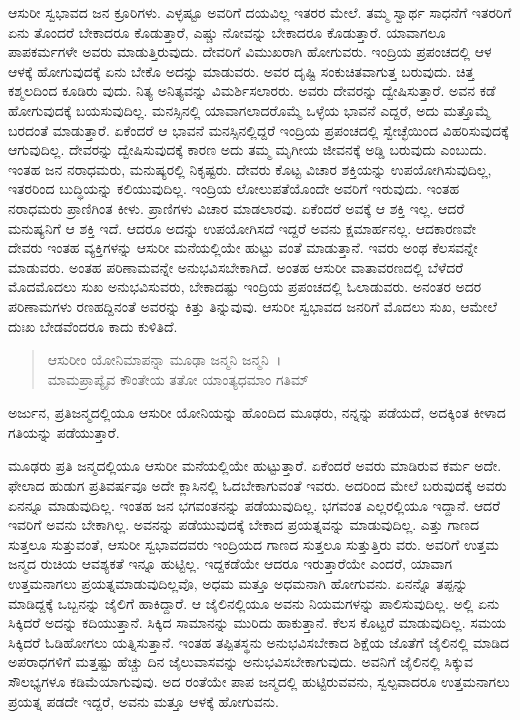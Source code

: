 ಆಸುರೀ ಸ್ವಭಾವದ ಜನ ಕ್ರೂರಿಗಳು. ಎಳ್ಳಷ್ಟೂ ಅವರಿಗೆ ದಯವಿಲ್ಲ ಇತರರ ಮೇಲೆ. ತಮ್ಮ ಸ್ವಾರ್ಥ ಸಾಧನೆಗೆ ಇತರರಿಗೆ ಏನು ತೊಂದರೆ ಬೇಕಾದರೂ ಕೊಡುತ್ತಾರೆ, ಎಷ್ಚು ನೋವನ್ನು ಬೇಕಾದರೂ ಕೊಡುತ್ತಾರೆ. ಯಾವಾಗಲೂ ಪಾಪಕರ್ಮಗಳೇ ಅವರು ಮಾಡುತ್ತಿರುವುದು. ದೇವರಿಗೆ ವಿಮುಖರಾಗಿ ಹೋಗುವರು. ಇಂದ್ರಿಯ ಪ್ರಪಂಚದಲ್ಲಿ ಆಳ ಆಳಕ್ಕೆ ಹೋಗುವುದಕ್ಕೆ ಏನು ಬೇಕೊ ಅದನ್ನು ಮಾಡುವರು. ಅವರ ದೃಷ್ಟಿ ಸಂಕುಚಿತವಾಗುತ್ತ ಬರುವುದು. ಚಿತ್ತ ಕಶ್ಮಲದಿಂದ ಕೂಡಿರು ವುದು. ನಿತ್ಯ ಅನಿತ್ಯವನ್ನು ವಿಮರ್ಶಿಸಲಾರರು. ಅವರು ದೇವರನ್ನು ದ್ವೇಷಿಸುತ್ತಾರೆ. ಅವನ ಕಡೆ ಹೋಗುವುದಕ್ಕೆ ಬಯಸುವುದಿಲ್ಲ. ಮನಸ್ಸಿನಲ್ಲಿ ಯಾವಾಗಲಾದರೊಮ್ಮೆ ಒಳ್ಳೆಯ ಭಾವನೆ ಎದ್ದರೆ, ಅದು ಮತ್ತೊಮ್ಮೆ ಬರದಂತೆ ಮಾಡುತ್ತಾರೆ. ಏಕೆಂದರೆ ಆ ಭಾವನೆ ಮನಸ್ಸಿನಲ್ಲಿದ್ದರೆ ಇಂದ್ರಿಯ ಪ್ರಪಂಚದಲ್ಲಿ ಸ್ವೇಚ್ಛೆಯಿಂದ ವಿಹರಿಸುವುದಕ್ಕೆ ಆಗುವುದಿಲ್ಲ. ದೇವರನ್ನು ದ್ವೇಷಿಸುವುದಕ್ಕೆ ಕಾರಣ ಅದು ತಮ್ಮ ಮೃಗೀಯ ಜೀವನಕ್ಕೆ ಅಡ್ಡಿ ಬರುವುದು ಎಂಬುದು. ಇಂತಹ ಜನ ನರಾಧಮರು, ಮನುಷ್ಯರಲ್ಲಿ ನಿಕೃಷ್ಟರು. ದೇವರು ಕೊಟ್ಟ ವಿಚಾರ ಶಕ್ತಿಯನ್ನು ಉಪಯೋಗಿಸುವುದಿಲ್ಲ, ಇತರರಿಂದ ಬುದ್ಧಿಯನ್ನು ಕಲಿಯುವುದಿಲ್ಲ. ಇಂದ್ರಿಯ ಲೋಲುಪತೆಯೊಂದೇ ಅವರಿಗೆ ಇರುವುದು. ಇಂತಹ ನರಾಧಮರು ಪ್ರಾಣಿಗಿಂತ ಕೀಳು. ಪ್ರಾಣಿಗಳು ವಿಚಾರ ಮಾಡಲಾರವು. ಏಕೆಂದರೆ ಅವಕ್ಕೆ ಆ ಶಕ್ತಿ ಇಲ್ಲ. ಆದರೆ ಮನುಷ್ಯನಿಗೆ ಆ ಶಕ್ತಿ ಇದೆ. ಆದರೂ ಅದನ್ನು ಉಪಯೋಗಿಸದೆ ಇದ್ದರೆ ಅವನು ಕ್ಷಮಾರ್ಹನಲ್ಲ. ಆದಕಾರಣವೇ ದೇವರು ಇಂತಹ ವ್ಯಕ್ತಿಗಳನ್ನು ಆಸುರೀ ಮನೆಯಲ್ಲಿಯೇ ಹುಟ್ಟು ವಂತೆ ಮಾಡುತ್ತಾನೆ. ಇವರು ಅಂಥ ಕೆಲಸವನ್ನೇ ಮಾಡುವರು. ಅಂತಹ ಪರಿಣಾಮವನ್ನೇ ಅನುಭವಿಸಬೇಕಾಗಿದೆ. ಅಂತಹ ಆಸುರೀ ವಾತಾವರಣದಲ್ಲಿ ಬೆಳೆದರೆ ಮೊದಮೊದಲು ಸುಖ ಅನುಭವಿಸುವರು, ಬೇಕಾದಷ್ಟು ಇಂದ್ರಿಯ ಪ್ರಪಂಚದಲ್ಲಿ ಓಲಾಡುವರು. ಅನಂತರ ಅದರ ಪರಿಣಾಮಗಳು ರಣಹದ್ದಿನಂತೆ ಅವರನ್ನು ಕಿತ್ತು ತಿನ್ನುವುವು. ಆಸುರೀ ಸ್ವಭಾವದ ಜನರಿಗೆ ಮೊದಲು ಸುಖ, ಆಮೇಲೆ ದುಃಖ ಬೇಡವೆಂದರೂ ಕಾದು ಕುಳಿತಿದೆ.

\begin{verse}
ಆಸುರೀಂ ಯೋನಿಮಾಪನ್ನಾ ಮೂಢಾ ಜನ್ಮನಿ ಜನ್ಮನಿ~।\\ಮಾಮಪ್ರಾಪ್ಯೈವ ಕೌಂತೇಯ ತತೋ ಯಾಂತ್ಯಧಮಾಂ ಗತಿಮ್ 
\end{verse}

{\small ಅರ್ಜುನ, ಪ್ರತಿಜನ್ಮದಲ್ಲಿಯೂ ಆಸುರೀ ಯೋನಿಯನ್ನು ಹೊಂದಿದ ಮೂಢರು, ನನ್ನನ್ನು ಪಡೆಯದೆ, ಅದಕ್ಕಿಂತ ಕೀಳಾದ ಗತಿಯನ್ನು ಪಡೆಯುತ್ತಾರೆ.}

ಮೂಢರು ಪ್ರತಿ ಜನ್ಮದಲ್ಲಿಯೂ ಆಸುರೀ ಮನೆಯಲ್ಲಿಯೇ ಹುಟ್ಟುತ್ತಾರೆ. ಏಕೆಂದರೆ ಅವರು ಮಾಡಿರುವ ಕರ್ಮ ಅದೇ. ಫೇಲಾದ ಹುಡುಗ ಪ್ರತಿವರ್ಷವೂ ಅದೇ ಕ್ಲಾಸಿನಲ್ಲಿ ಓದಬೇಕಾಗುವಂತೆ ಇವರು. ಅದರಿಂದ ಮೇಲೆ ಬರುವುದಕ್ಕೆ ಅವರು ಏನನ್ನೂ ಮಾಡುವುದಿಲ್ಲ. ಇಂತಹ ಜನ ಭಗವಂತನನ್ನು ಪಡೆಯುವುದಿಲ್ಲ. ಭಗವಂತ ಎಲ್ಲರಲ್ಲಿಯೂ ಇದ್ದಾನೆ. ಆದರೆ ಇವರಿಗೆ ಅವನು ಬೇಕಾಗಿಲ್ಲ. ಅವನನ್ನು ಪಡೆಯುವುದಕ್ಕೆ ಬೇಕಾದ ಪ್ರಯತ್ನವನ್ನು ಮಾಡುವುದಿಲ್ಲ. ಎತ್ತು ಗಾಣದ ಸುತ್ತಲೂ ಸುತ್ತುವಂತೆ, ಆಸುರೀ ಸ್ವಭಾವದವರು ಇಂದ್ರಿಯದ ಗಾಣದ ಸುತ್ತಲೂ ಸುತ್ತುತ್ತಿರು ವರು. ಅವರಿಗೆ ಉತ್ತಮ ಜನ್ಮದ ರುಚಿಯ ಆವಶ್ಯಕತೆ ಇನ್ನೂ ಹುಟ್ಟಿಲ್ಲ. ಇದ್ದಕಡೆಯೇ ಆದರೂ ಇರುತ್ತಾರೆಯೇ ಎಂದರೆ, ಯಾವಾಗ ಉತ್ತಮನಾಗಲು ಪ್ರಯತ್ನಮಾಡುವುದಿಲ್ಲವೊ, ಅಧಮ ಮತ್ತೂ ಅಧಮನಾಗಿ ಹೋಗುವನು. ಏನನ್ನೊ ತಪ್ಪನ್ನು ಮಾಡಿದ್ದಕ್ಕೆ ಒಬ್ಬನನ್ನು ಜೈಲಿಗೆ ಹಾಕಿದ್ದಾರೆ. ಆ ಜೈಲಿನಲ್ಲಿಯೂ ಅವನು ನಿಯಮಗಳನ್ನು ಪಾಲಿಸುವುದಿಲ್ಲ. ಅಲ್ಲಿ ಏನು ಸಿಕ್ಕಿದರೆ ಅದನ್ನು ಕದಿಯುತ್ತಾನೆ. ಸಿಕ್ಕಿದ ಸಾಮಾನನ್ನು ಮುರಿದು ಹಾಕುತ್ತಾನೆ. ಕೆಲಸ ಕೊಟ್ಟರೆ ಮಾಡುವುದಿಲ್ಲ. ಸಮಯ ಸಿಕ್ಕಿದರೆ ಓಡಿಹೋಗಲು ಯತ್ನಿಸುತ್ತಾನೆ. ಇಂತಹ ತಪ್ಪಿತಸ್ಥನು ಅನುಭವಿಸಬೇಕಾದ ಶಿಕ್ಷೆಯ ಜೊತೆಗೆ ಜೈಲಿನಲ್ಲಿ ಮಾಡಿದ ಅಪರಾಧಗಳಿಗೆ ಮತ್ತಷ್ಟು ಹೆಚ್ಚು ದಿನ ಜೈಲುವಾಸವನ್ನು ಅನುಭವಿಸಬೇಕಾಗುವುದು. ಅವನಿಗೆ ಜೈಲಿನಲ್ಲಿ ಸಿಕ್ಕುವ ಸೌಲಭ್ಯಗಳೂ ಕಡಿಮೆಯಾಗುವುವು. ಅದ ರಂತೆಯೇ ಪಾಪ ಜನ್ಮದಲ್ಲಿ ಹುಟ್ಟಿರುವವನು, ಸ್ವಲ್ಪವಾದರೂ ಉತ್ತಮನಾಗಲು ಪ್ರಯತ್ನ ಪಡದೇ ಇದ್ದರೆ, ಅವನು ಮತ್ತೂ ಆಳಕ್ಕೆ ಹೋಗುವನು.

